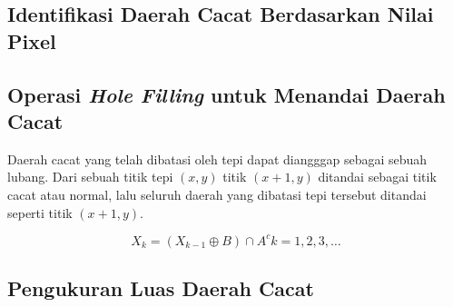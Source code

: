 \documentclass[laporan.tex]{subfiles}
\begin{document}
\subsection{Identifikasi Daerah Cacat Berdasarkan Nilai Pixel}

\subsection{Operasi \emph{Hole Filling} untuk Menandai Daerah Cacat}

Daerah cacat yang telah dibatasi oleh tepi dapat diangggap sebagai sebuah lubang. Dari sebuah titik tepi $(x, y)$ titik $(x+1, y)$ ditandai sebagai titik cacat atau normal, lalu seluruh daerah yang dibatasi tepi tersebut ditandai seperti titik $(x+1, y)$.

\begin{equation}
X_k = (X_{k-1} \oplus B) \cap A^c  k=1,2,3,\ldots
\end{equation}

\subsection{Pengukuran Luas Daerah Cacat}
\end{document}
